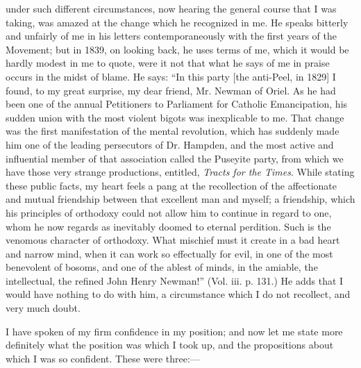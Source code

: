 under such different circumstances, now hearing the general course that
I was taking, was amazed at the change which he recognized in me. He
speaks bitterly and unfairly of me in his letters contemporaneously with
the first years of the Movement; but in 1839, on looking
back, he uses terms of me, which it would be hardly modest in me to
quote, were it not that what he says of me in praise occurs
in the midst of blame. He says: ``In this party [the anti-Peel,
in 1829] I found, to my great surprise, my dear
friend, Mr. Newman of Oriel. As he had been one of the annual
Petitioners to Parliament for Catholic Emancipation, his sudden union
with the most violent bigots was inexplicable to me. That change was the
first manifestation of the mental revolution, which has suddenly made
him one of the leading persecutors of Dr. Hampden, and the most active
and influential member of that association called the Puseyite party,
from which we have those very strange productions, entitled, \emph{Tracts for
the Times}. While stating these public facts, my heart feels a pang at
the recollection of the affectionate and mutual friendship between that
excellent man and myself; a friendship, which his principles of orthodoxy
could not allow him to continue in regard to one, whom he now regards as
inevitably doomed to eternal perdition. Such is the venomous character
of orthodoxy. What mischief must it create in a bad heart and
narrow mind, when it can work so effectually for evil, in one of the
most benevolent of bosoms, and one of the ablest of minds, in the
amiable, the intellectual, the refined John Henry Newman!'' (Vol.
iii. p. 131.) He adds that I would have nothing to do with him, a
circumstance which I do not recollect, and very much doubt.

I have spoken of my firm confidence in my position; and now let me
state more definitely what the position was which I took up, and the
propositions about which I was so confident. These were three:—

